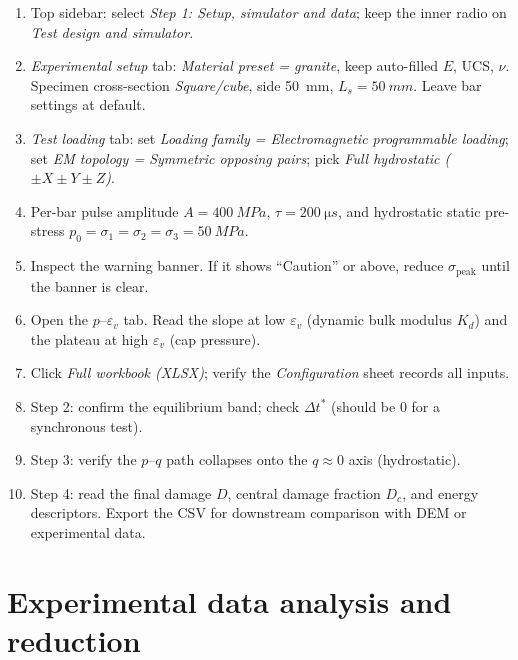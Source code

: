 \documentclass[11pt,a4paper,openany]{book}
\providecommand{\SI}[2]{\qty{#1}{#2}}
\theoremstyle{handbook}
\newcommand{\sig}{\sigma}
\newcommand{\eps}{\varepsilon}
\newcommand{\Ls}{L_s}
\newcommand{\sigpeak}{\sig_{\text{peak}}}
\begin{document}
\begin{stepbox}
\begin{enumerate}[leftmargin=*,itemsep=3pt]
  \item Top sidebar: select \emph{Step 1: Setup, simulator and data}; keep
        the inner radio on \emph{Test design and simulator}.
  \item \emph{Experimental setup} tab: \emph{Material preset = granite},
        keep auto-filled $E$, UCS, $\nu$. Specimen cross-section
        \emph{Square/cube}, side \SI{50}{mm}, $\Ls=\SI{50}{mm}$. Leave bar
        settings at default.
  \item \emph{Test loading} tab: set \emph{Loading family =
        Electromagnetic programmable loading}; set \emph{EM topology =
        Symmetric opposing pairs}; pick \emph{Full hydrostatic
        ($\pm X\pm Y\pm Z$)}.
  \item Per-bar pulse amplitude $A=\SI{400}{MPa}$,
        $\tau=\SI{200}{\micro s}$, and hydrostatic static pre-stress
        $p_0=\sig_1=\sig_2=\sig_3=\SI{50}{MPa}$.
  \item Inspect the warning banner. If it shows ``Caution'' or above,
        reduce $\sigpeak$ until the banner is clear.
  \item Open the $p$--$\eps_v$ tab. Read the slope at low $\eps_v$ (dynamic
        bulk modulus $K_d$) and the plateau at high $\eps_v$ (cap
        pressure).
  \item Click \emph{Full workbook (XLSX)}; verify the
        \emph{Configuration} sheet records all inputs.
  \item Step 2: confirm the equilibrium band; check $\Delta t^{\ast}$
        (should be 0 for a synchronous test).
  \item Step 3: verify the $p$--$q$ path collapses onto the $q\approx 0$
        axis (hydrostatic).
  \item Step 4: read the final damage $D$, central damage fraction $D_c$,
        and energy descriptors. Export the CSV for downstream comparison
        with DEM or experimental data.
\end{enumerate}
\end{stepbox}

\chapter{Experimental data analysis and reduction}\label{ch:expdata}
\end{document}

